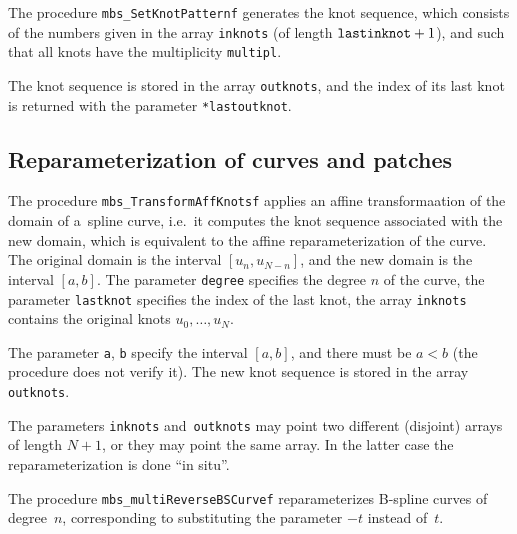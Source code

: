 \vspace{\bigskipamount}
The procedure \texttt{mbs\_SetKnotPatternf} generates the knot sequence,
which consists of the numbers given in the array \texttt{inknots}
(of length $\mathord{\mbox{\texttt{lastinknot}}}+1$),
and such that all knots have the multiplicity \texttt{multipl}.

The knot sequence is stored in the array \texttt{outknots}, and the index of
its last knot is returned with the parameter \texttt{*lastoutknot}.


\newpage
\subsection{Reparameterization of curves and patches}

\begin{sloppypar}
\hspace*{\parindent}The procedure \texttt{mbs\_TransformAffKnotsf} applies
an affine transformaation of the domain of a~spline curve, i.e.\ it computes
the knot sequence associated with the new domain, which is equivalent to
the affine reparameterization of the curve.
The original domain is the interval $[u_n,u_{N-n}]$, and the new domain
is the interval $[a,b]$. The parameter \texttt{degree}
specifies the degree $n$ of the curve, the parameter \texttt{lastknot}
specifies the index of the last knot, the array \texttt{inknots} contains
the original knots $u_0,\ldots,u_N$.
\end{sloppypar}

The parameter \texttt{a}, \texttt{b} specify the interval $[a,b]$,
and there must be $a<b$ (the procedure does not verify it).
The new knot sequence is stored in the array \texttt{outknots}.

The parameters \texttt{inknots} and~\texttt{outknots} may point two different
(disjoint) arrays of length $N+1$, or they may point the same array.
In the latter case the reparameterization is done ``in situ''.

\vspace{\bigskipamount}
The procedure \texttt{mbs\_multiReverseBSCurvef} reparameterizes B-spline curves
of degree~$n$, corresponding to substituting the parameter $-t$ instead of~$t$.

